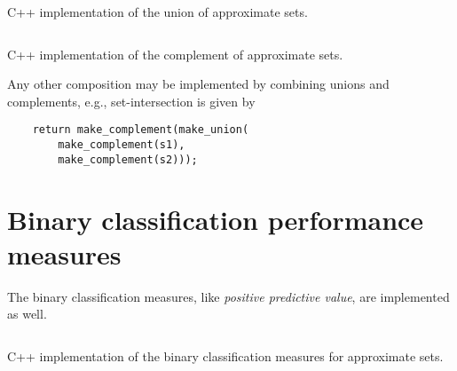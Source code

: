\documentclass[ ../main.tex]{subfiles}
\begin{document}

\begin{listing}
\inputminted[breaklines]{c++}{code/random_approximate_sets_adt/include/approximate_set/dynamic/aset_union.hpp}
\caption{C++ implementation of the union of approximate sets.}
\label{lst:asetunion}
\end{listing}

\begin{listing}
\inputminted[breaklines]{c++}{code/random_approximate_sets_adt/include/approximate_set/dynamic/aset_complement.hpp}
\caption{C++ implementation of the complement of approximate sets.}
\label{lst:asetcomp}
\end{listing}

Any other composition may be implemented by combining unions and complements, e.g., set-intersection is given by
\begin{verbatim}
    return make_complement(make_union(
        make_complement(s1),
        make_complement(s2)));
\end{verbatim}

\section{Binary classification performance measures}
The binary classification measures, like \emph{positive predictive value}, are implemented as well.

\begin{listing}
\inputminted[breaklines]{c++}{code/random_approximate_sets_adt/include/approximate_set/binary_classification.hpp}
\caption{C++ implementation of the binary classification measures for 
approximate sets.}
\label{lst:binclass}
\end{listing}
\end{document}
